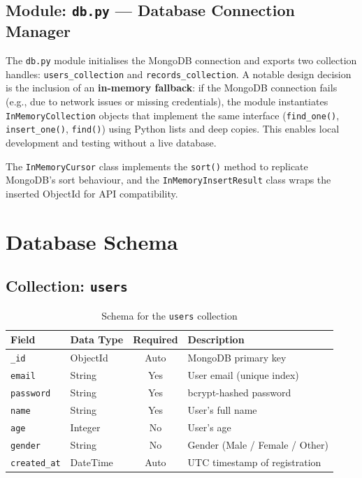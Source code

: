 \documentclass[12pt, a4paper, oneside]{report}
\begin{document}
\subsection{Module: \texttt{db.py} --- Database Connection Manager}
\label{subsec:db_py}

The \texttt{db.py} module initialises the MongoDB connection and exports two collection handles: \texttt{users\_collection} and \texttt{records\_collection}. A notable design decision is the inclusion of an \textbf{in-memory fallback}: if the MongoDB connection fails (e.g., due to network issues or missing credentials), the module instantiates \texttt{InMemoryCollection} objects that implement the same interface (\texttt{find\_one()}, \texttt{insert\_one()}, \texttt{find()}) using Python lists and deep copies. This enables local development and testing without a live database.

The \texttt{InMemoryCursor} class implements the \texttt{sort()} method to replicate MongoDB's sort behaviour, and the \texttt{InMemoryInsertResult} class wraps the inserted ObjectId for API compatibility.

\section{Database Schema}
\label{sec:db_schema}

\subsection{Collection: \texttt{users}}

\begin{table}[H]
\centering
\caption{Schema for the \texttt{users} collection}
\label{tab:users_schema}
\begin{tabularx}{\textwidth}{llcX}
\toprule
\textbf{Field} & \textbf{Data Type} & \textbf{Required} & \textbf{Description} \\
\midrule
\texttt{\_id} & ObjectId & Auto & MongoDB primary key \\
\texttt{email} & String & Yes & User email (unique index) \\
\texttt{password} & String & Yes & bcrypt-hashed password \\
\texttt{name} & String & Yes & User's full name \\
\texttt{age} & Integer & No & User's age \\
\texttt{gender} & String & No & Gender (Male / Female / Other) \\
\texttt{created\_at} & DateTime & Auto & UTC timestamp of registration \\
\bottomrule
\end{tabularx}
\end{table}
\end{document}
